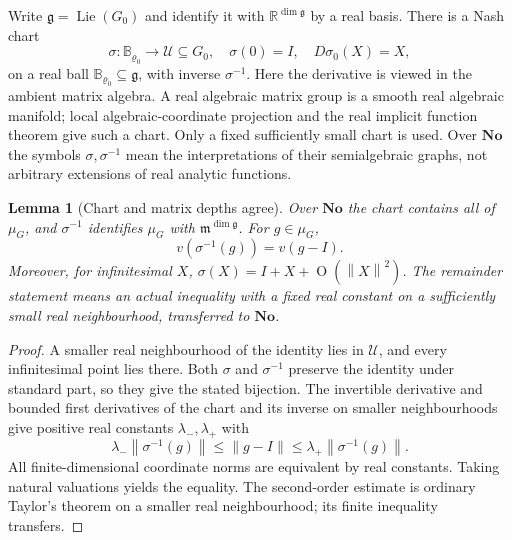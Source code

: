 \documentclass[11pt,letterpaper]{article}
\numberwithin{equation}{section}
\newtheorem{lemma}[lemma]{Lemma}
\theoremstyle{definition}
\theoremstyle{remark}
\newcommand{\No}{\mathbf{No}}
\newcommand{\R}{\mathbb R}
\newcommand{\mm}{\mathfrak m}
\newcommand{\norm}[1]{\left\lVert#1\right\rVert}
\newcommand{\smallO}{\operatorname{O}}
\newcommand{\Lie}{\operatorname{Lie}}
\begin{document}
Write $\mathfrak g=\Lie(G_0)$ and identify it with $\R^{\dim\mathfrak g}$ by a
real basis. There is a Nash chart
\begin{equation}\label{e3:cpt:eq:chart}
 \sigma:\mathbb B_{\varrho_0}\longrightarrow\mathcal U\subseteq G_0,
 \quad \sigma(0)=I,\quad D\sigma_0(X)=X,
\end{equation}
on a real ball $\mathbb B_{\varrho_0}\subseteq\mathfrak g$, with inverse
$\sigma^{-1}$. Here the derivative is viewed in the ambient matrix algebra. A
real algebraic matrix group is a smooth real algebraic manifold; local
algebraic-coordinate projection and the real implicit function theorem give
such a chart. Only a fixed sufficiently small chart is used. Over $\No$ the
symbols $\sigma,\sigma^{-1}$ mean the interpretations of their semialgebraic
graphs, not arbitrary extensions of real analytic functions.

\begin{lemma}[Chart and matrix depths agree]\label{e3:cpt:lem:chart-depth}
Over $\No$ the chart contains all of $\mu_G$, and $\sigma^{-1}$ identifies
$\mu_G$ with $\mm^{\dim\mathfrak g}$. For $g\in\mu_G$,
\[
 v(\sigma^{-1}(g))=v(g-I).
\]
Moreover, for infinitesimal $X$,
$\sigma(X)=I+X+\smallO(\norm{X}^2)$. The remainder statement means an actual
inequality with a fixed real constant on a sufficiently small real
neighbourhood, transferred to $\No$.
\end{lemma}
\begin{proof}
A smaller real neighbourhood of the identity lies in $\mathcal U$, and every
infinitesimal point lies there. Both $\sigma$ and $\sigma^{-1}$ preserve the
identity under standard part, so they give the stated bijection. The invertible
derivative and bounded first derivatives of the chart and its inverse on
smaller neighbourhoods give positive real constants $\lambda_-,\lambda_+$ with
\[
 \lambda_-\norm{\sigma^{-1}(g)}\le\norm{g-I}\le\lambda_+\norm{\sigma^{-1}(g)}.
\]
All finite-dimensional coordinate norms are equivalent by real constants.
Taking natural valuations yields the equality. The second-order estimate is
ordinary Taylor's theorem on a smaller real neighbourhood; its finite
inequality transfers.
\end{proof}
\end{document}
